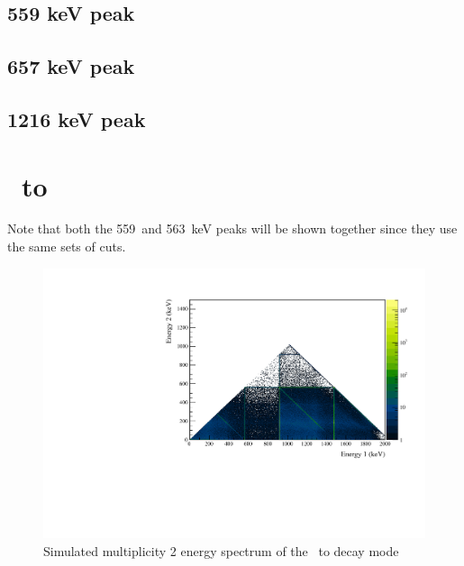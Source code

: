 \documentclass[/main.tex]{subfiles}
\begin{document}
\subsection{559 keV peak}
\subsection{657 keV peak}
\subsection{1216 keV peak}



\section{\znbb\ to }
Note that both the 559~and 563~keV peaks will be shown together since they use the same sets of cuts.
\begin{figure}[!htb]
  \centering
  \includegraphics[width=.8\linewidth]{ESsim_0vBB_ES0_1}
  \caption[Simulation of \znbb\ to ]{
    Simulated multiplicity 2 energy spectrum of the \znbb\ to  decay mode}
\end{figure}

\end{document}
